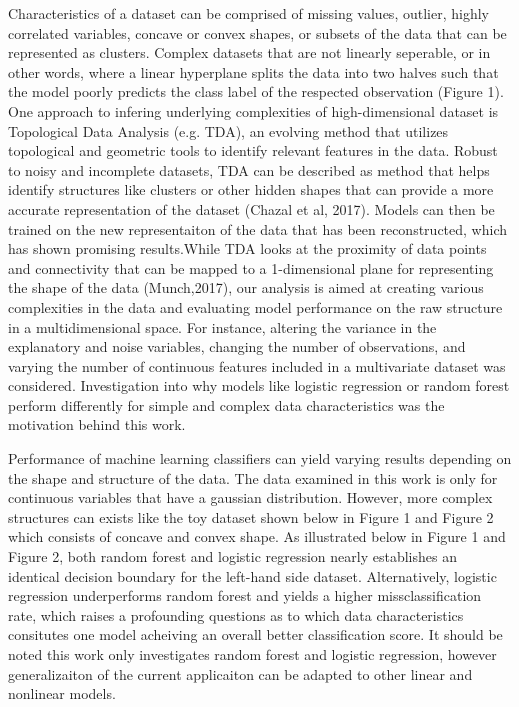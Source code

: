 \documentclass{llncs}
\begin{document}
Characteristics of a dataset can be comprised of missing values, outlier, highly correlated variables, concave or convex shapes, or subsets of the data that can be represented as clusters. Complex datasets that are not linearly seperable, or in other words, where a linear hyperplane splits the data into two halves such that the model poorly predicts the class label of the respected observation (Figure 1). One approach to infering underlying complexities of high-dimensional dataset is Topological Data Analysis (e.g. TDA), an evolving method that utilizes topological and geometric tools to identify relevant features in the data. Robust to noisy and incomplete datasets, TDA can be described as method that helps identify structures like clusters or other hidden shapes that can provide a more accurate representation of the dataset (Chazal et al, 2017). Models can then be trained on the new representaiton of the data that has been reconstructed, which has shown promising results.While TDA looks at the proximity of data points and connectivity that can be mapped to a 1-dimensional plane for representing the shape of the data (Munch,2017), our analysis is aimed at creating various complexities in the data and evaluating model performance on the raw structure in a multidimensional space. For instance, altering the variance in the explanatory and noise variables, changing the number of observations, and varying the number of continuous features included in a multivariate dataset was considered. Investigation into why models like logistic regression or random forest perform differently for simple and complex data characteristics was the motivation behind this work.


Performance of machine learning classifiers can yield varying results depending on the shape and structure of the data. The data examined in this work is only for continuous variables that have a gaussian distribution. However, more complex structures can exists like the toy dataset shown below in Figure 1 and Figure 2 which consists of concave and convex shape. As illustrated below in Figure 1 and Figure 2, both random forest and logistic regression nearly establishes an identical decision boundary for the left-hand side dataset. Alternatively, logistic regression underperforms random forest and yields a higher missclassification rate, which raises a profounding questions as to which data characteristics consitutes one model acheiving an overall better classification score. It should be noted this work only investigates random forest and logistic regression, however generalizaiton of the current applicaiton can be adapted to other linear and nonlinear models. 
\end{document}
